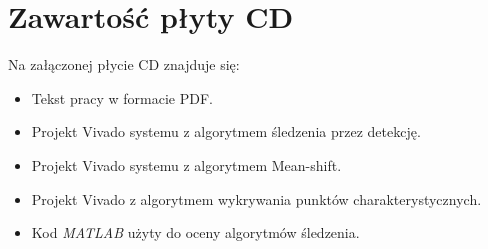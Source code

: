 \chapter{Zawartość płyty CD}
\label{cha:zawartoscplytycd}

Na załączonej płycie CD znajduje się:
\begin{itemize}
\item Tekst pracy w formacie PDF.
\item Projekt Vivado systemu z algorytmem śledzenia przez detekcję.
\item Projekt Vivado systemu z algorytmem Mean-shift.
\item Projekt Vivado z algorytmem wykrywania punktów charakterystycznych.
\item Kod \textit{MATLAB} użyty do oceny algorytmów śledzenia.
\end{itemize}